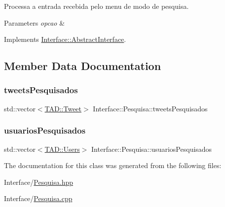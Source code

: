 Processa a entrada recebida pelo menu de modo de pesquisa. 


\begin{DoxyParams}{Parameters}
{\em opcao} & \\
\hline
\end{DoxyParams}


Implements \hyperlink{class_interface_1_1_abstract_interface_a9318f98f907ce54ef2dbf892ba327da2}{Interface\+::\+Abstract\+Interface}.



\subsection{Member Data Documentation}
\mbox{\label{class_interface_1_1_pesquisa_a727e0bf877914015276da14ca1e8cf16}} 
\subsubsection{\texorpdfstring{tweets\+Pesquisados}{tweetsPesquisados}}
{\footnotesize\ttfamily std\+::vector$<$\hyperlink{class_t_a_d_1_1_tweet}{T\+A\+D\+::\+Tweet}$>$ Interface\+::\+Pesquisa\+::tweets\+Pesquisados\hspace{0.3cm}{\ttfamily [private]}}

\mbox{\label{class_interface_1_1_pesquisa_a5c4e622554020b6f73f1c7a804f96b58}} 
\subsubsection{\texorpdfstring{usuarios\+Pesquisados}{usuariosPesquisados}}
{\footnotesize\ttfamily std\+::vector$<$\hyperlink{class_t_a_d_1_1_users}{T\+A\+D\+::\+Users}$>$ Interface\+::\+Pesquisa\+::usuarios\+Pesquisados\hspace{0.3cm}{\ttfamily [private]}}



The documentation for this class was generated from the following files\+:\begin{DoxyCompactItemize}
\item 
Interface/\hyperlink{_pesquisa_8hpp}{Pesquisa.\+hpp}\item 
Interface/\hyperlink{_pesquisa_8cpp}{Pesquisa.\+cpp}\end{DoxyCompactItemize}
